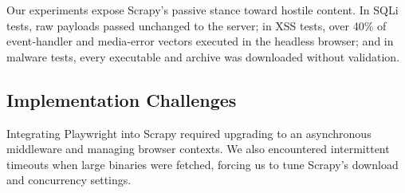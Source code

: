 



Our experiments expose Scrapy’s passive stance toward hostile content. In SQLi tests, raw payloads passed unchanged to the server; in XSS tests, over 40\% of event‐handler and media‐error vectors executed in the headless browser; and in malware tests, every executable and archive was downloaded without validation.  

\subsection{Implementation Challenges}
Integrating Playwright into Scrapy required upgrading to an asynchronous middleware and managing browser contexts. We also encountered intermittent timeouts when large binaries were fetched, forcing us to tune Scrapy’s download and concurrency settings.


